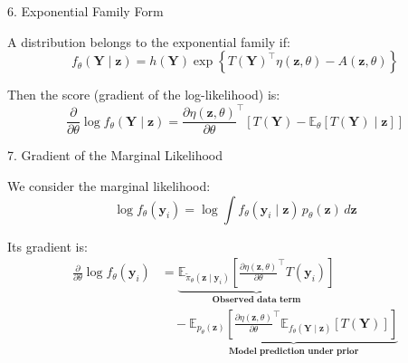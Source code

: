 \documentclass{beamer}
\begin{document}
\begin{frame}{6. Exponential Family Form}

A distribution belongs to the exponential family if:
\begin{equation*}
f_\theta(\mathbf{Y} \mid \mathbf{z}) 
= h(\mathbf{Y}) \exp\left\{
T(\mathbf{Y})^\top \eta(\mathbf{z}, \theta) - A(\mathbf{z}, \theta)
\right\}
\end{equation*}

\vspace{0.5em}
Then the score (gradient of the log-likelihood) is:
\begin{equation*}
\frac{\partial}{\partial \theta} \log f_\theta(\mathbf{Y} \mid \mathbf{z}) 
= \frac{\partial \eta(\mathbf{z}, \theta)}{\partial \theta}^\top 
\left[
T(\mathbf{Y}) - \mathbb{E}_\theta \left[ T(\mathbf{Y}) \mid \mathbf{z} \right]
\right]
\end{equation*}

\end{frame}

\begin{frame}{7. Gradient of the Marginal Likelihood}

We consider the marginal likelihood:
\begin{equation*}
\log f_\theta(\mathbf{y}_i) 
= \log \int f_\theta(\mathbf{y}_i \mid \mathbf{z}) \, p_\theta(\mathbf{z}) \, d\mathbf{z}
\end{equation*}

Its gradient is:
\begin{align*}
\frac{\partial}{\partial \theta} \log f_\theta(\mathbf{y}_i)
&= \underbrace{\mathbb{E}_{\tilde{\pi}_\theta(\mathbf{z} \mid \mathbf{y}_i)} \left[
\frac{\partial \eta(\mathbf{z}, \theta)}{\partial \theta}^\top T(\mathbf{y}_i)
\right]}_{\textbf{Observed data term}} \\
&\quad - \underbrace{\mathbb{E}_{p_\theta(\mathbf{z})} \left[
\frac{\partial \eta(\mathbf{z}, \theta)}{\partial \theta}^\top 
\mathbb{E}_{f_\theta(\mathbf{Y} \mid \mathbf{z})} \left[ T(\mathbf{Y}) \right]
\right]}_{\textbf{Model prediction under prior}}
\end{align*}

\end{frame}
\end{document}
